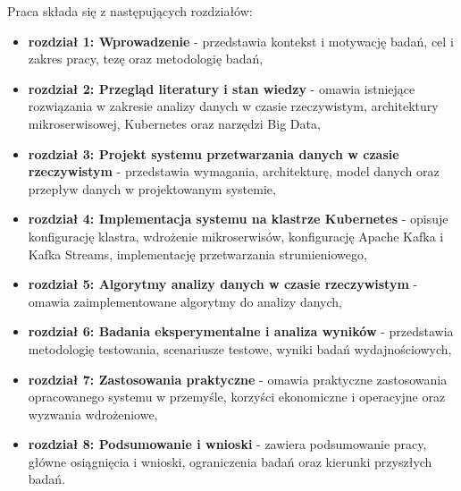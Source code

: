 Praca składa się z następujących rozdziałów:

\begin{itemize}
    \item \textbf{rozdział 1: Wprowadzenie} - przedstawia kontekst i motywację badań, cel i zakres pracy, tezę oraz metodologię badań,
    \item \textbf{rozdział 2: Przegląd literatury i stan wiedzy} - omawia istniejące rozwiązania w zakresie analizy danych w czasie rzeczywistym, architektury mikroserwisowej, Kubernetes oraz narzędzi Big Data,
    \item \textbf{rozdział 3: Projekt systemu przetwarzania danych w czasie rzeczywistym} - przedstawia wymagania, architekturę, model danych oraz przepływ danych w projektowanym systemie,
    \item \textbf{rozdział 4: Implementacja systemu na klastrze Kubernetes} - opisuje konfigurację klastra, wdrożenie mikroserwisów, konfigurację Apache Kafka i Kafka Streams, implementację przetwarzania strumieniowego,
    \item \textbf{rozdział 5: Algorytmy analizy danych w czasie rzeczywistym} - omawia zaimplementowane algorytmy do analizy danych,
    \item \textbf{rozdział 6: Badania eksperymentalne i analiza wyników} - przedstawia metodologię testowania, scenariusze testowe, wyniki badań wydajnościowych,
    \item \textbf{rozdział 7: Zastosowania praktyczne} - omawia praktyczne zastosowania opracowanego systemu w przemyśle, korzyści ekonomiczne i operacyjne oraz wyzwania wdrożeniowe,
    \item \textbf{rozdział 8: Podsumowanie i wnioski} - zawiera podsumowanie pracy, główne osiągnięcia i wnioski, ograniczenia badań oraz kierunki przyszłych badań.
\end{itemize} 